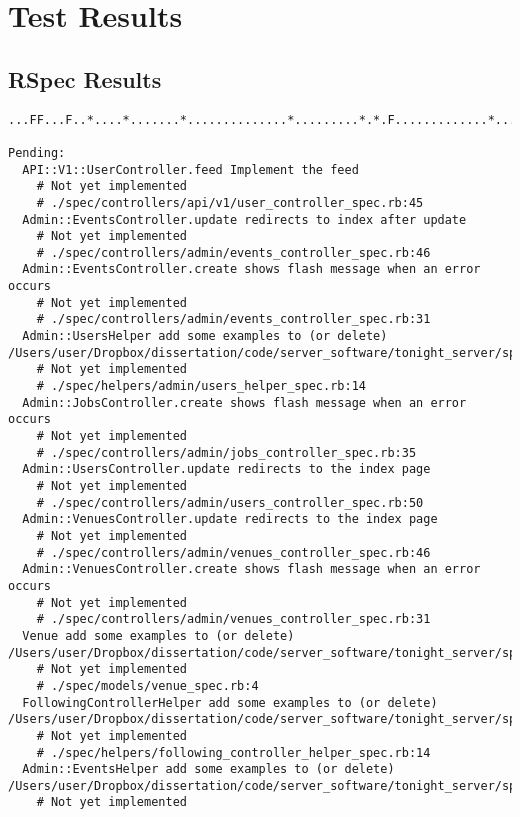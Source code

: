 \chapter{Test Results}

\section{RSpec Results}

\begin{lstlisting}
...FF...F..*....*.......*..............*.........*.*.F.............*.......*..******..............*.*...........*

Pending:
  API::V1::UserController.feed Implement the feed
    # Not yet implemented
    # ./spec/controllers/api/v1/user_controller_spec.rb:45
  Admin::EventsController.update redirects to index after update
    # Not yet implemented
    # ./spec/controllers/admin/events_controller_spec.rb:46
  Admin::EventsController.create shows flash message when an error occurs
    # Not yet implemented
    # ./spec/controllers/admin/events_controller_spec.rb:31
  Admin::UsersHelper add some examples to (or delete) /Users/user/Dropbox/dissertation/code/server_software/tonight_server/spec/helpers/admin/users_helper_spec.rb
    # Not yet implemented
    # ./spec/helpers/admin/users_helper_spec.rb:14
  Admin::JobsController.create shows flash message when an error occurs
    # Not yet implemented
    # ./spec/controllers/admin/jobs_controller_spec.rb:35
  Admin::UsersController.update redirects to the index page
    # Not yet implemented
    # ./spec/controllers/admin/users_controller_spec.rb:50
  Admin::VenuesController.update redirects to the index page
    # Not yet implemented
    # ./spec/controllers/admin/venues_controller_spec.rb:46
  Admin::VenuesController.create shows flash message when an error occurs
    # Not yet implemented
    # ./spec/controllers/admin/venues_controller_spec.rb:31
  Venue add some examples to (or delete) /Users/user/Dropbox/dissertation/code/server_software/tonight_server/spec/models/venue_spec.rb
    # Not yet implemented
    # ./spec/models/venue_spec.rb:4
  FollowingControllerHelper add some examples to (or delete) /Users/user/Dropbox/dissertation/code/server_software/tonight_server/spec/helpers/following_controller_helper_spec.rb
    # Not yet implemented
    # ./spec/helpers/following_controller_helper_spec.rb:14
  Admin::EventsHelper add some examples to (or delete) /Users/user/Dropbox/dissertation/code/server_software/tonight_server/spec/helpers/admin/events_helper_spec.rb
    # Not yet implemented

\end{lstlisting}
